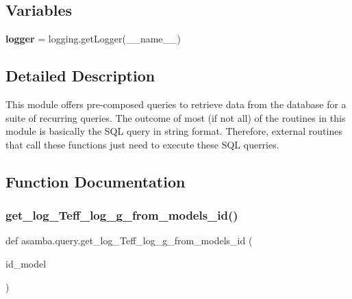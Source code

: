 \subsection*{Variables}
\begin{DoxyCompactItemize}
\item 
\mbox{\label{namespaceasamba_1_1query_a7178987eb523c25a790c9a4533e79367}} 
{\bfseries logger} = logging.\+get\+Logger(\+\_\+\+\_\+name\+\_\+\+\_\+)
\end{DoxyCompactItemize}


\subsection{Detailed Description}
\begin{DoxyVerb}This module offers pre-composed queries to retrieve data from the database for a suite of 
recurring queries.
The outcome of most (if not all) of the routines in this module is basically the SQL query in 
string format. Therefore, external routines that call these functions just need to execute these
SQL querries.
\end{DoxyVerb}
 

\subsection{Function Documentation}
\mbox{\label{namespaceasamba_1_1query_a3fb6d746d8c1dde610f066a9b319cc8f}} 
\subsubsection{\texorpdfstring{get\+\_\+log\+\_\+\+Teff\+\_\+log\+\_\+g\+\_\+from\+\_\+models\+\_\+id()}{get\_log\_Teff\_log\_g\_from\_models\_id()}}
{\footnotesize\ttfamily def asamba.\+query.\+get\+\_\+log\+\_\+\+Teff\+\_\+log\+\_\+g\+\_\+from\+\_\+models\+\_\+id (\begin{DoxyParamCaption}\item[{}]{id\+\_\+model }\end{DoxyParamCaption})}

